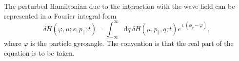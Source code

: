 The perturbed Hamiltonian 
due to the interaction with the wave field
can be  represented in a Fourier integral form
\begin{equation}\label{eq.def_H}
    \delta H(\varphi,\mu; s,p_\|;t) = 
     \int_{-\infty}^{\infty} \mathrm{d} q~{\delta H}\left(\mu, p_\|, q ; t\right) e^{\imath\left(\phi_{q}-\varphi\right)},
\end{equation}
where %
$\varphi$ is the particle gyroangle.
The convention is that the real part of the equation is to be taken.

